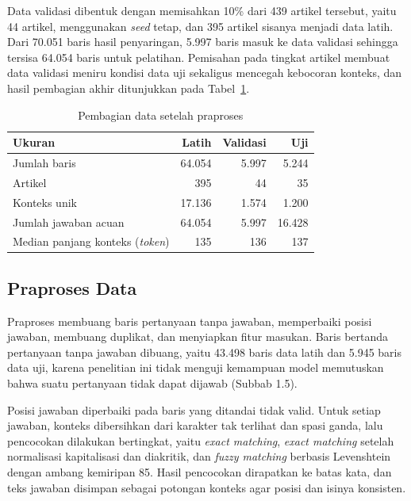 Data validasi dibentuk dengan memisahkan 10\% dari 439 artikel tersebut, yaitu 44 artikel, menggunakan \textit{seed} tetap, dan 395 artikel sisanya menjadi data latih. Dari 70.051 baris hasil penyaringan, 5.997 baris masuk ke data validasi sehingga tersisa 64.054 baris untuk pelatihan. Pemisahan pada tingkat artikel membuat data validasi meniru kondisi data uji sekaligus mencegah kebocoran konteks, dan hasil pembagian akhir ditunjukkan pada Tabel~\ref{tab:pembagian-data}.

\begin{table}[!ht]
  \centering
  \small
  \renewcommand{\arraystretch}{1.2}
  \caption{Pembagian data setelah praproses}
  \label{tab:pembagian-data}
  \begin{tabularx}{\textwidth}{@{}Xrrr@{}}
    \hline
    \textbf{Ukuran} & \textbf{Latih} & \textbf{Validasi} & \textbf{Uji} \\
    \hline
    Jumlah baris & 64.054 & 5.997 & 5.244 \\
    Artikel & 395 & 44 & 35 \\
    Konteks unik & 17.136 & 1.574 & 1.200 \\
    Jumlah jawaban acuan & 64.054 & 5.997 & 16.428 \\
    Median panjang konteks (\textit{token}) & 135 & 136 & 137 \\
    \hline
  \end{tabularx}
\end{table}

\subsection{Praproses Data}

Praproses membuang baris pertanyaan tanpa jawaban, memperbaiki posisi jawaban, membuang duplikat, dan menyiapkan fitur masukan. Baris bertanda pertanyaan tanpa jawaban dibuang, yaitu 43.498 baris data latih dan 5.945 baris data uji, karena penelitian ini tidak menguji kemampuan model memutuskan bahwa suatu pertanyaan tidak dapat dijawab (Subbab 1.5).

Posisi jawaban diperbaiki pada baris yang ditandai tidak valid. Untuk setiap jawaban, konteks dibersihkan dari karakter tak terlihat dan spasi ganda, lalu pencocokan dilakukan bertingkat, yaitu \textit{exact matching}, \textit{exact matching} setelah normalisasi kapitalisasi dan diakritik, dan \textit{fuzzy matching} berbasis Levenshtein dengan ambang kemiripan 85. Hasil pencocokan dirapatkan ke batas kata, dan teks jawaban disimpan sebagai potongan konteks agar posisi dan isinya konsisten.

